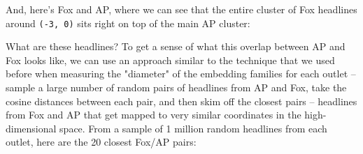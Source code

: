 \documentclass{scrartcl}
\begin{document}
And, here's Fox and AP, where we can see that the entire cluster of Fox headlines around \texttt{(-3, 0)} sits right on top of the main AP cluster:


What are these headlines? To get a sense of what this overlap between AP and Fox looks like, we can use an approach similar to the technique that we used before when measuring the "diameter" of the embedding families for each outlet -- sample a large number of random pairs of headlines from AP and Fox, take the cosine distances between each pair, and then skim off the closest pairs -- headlines from Fox and AP that get mapped to very similar coordinates in the high-dimensional space. From a sample of 1 million random headlines from each outlet, here are the 20 closest Fox/AP pairs:
\end{document}
